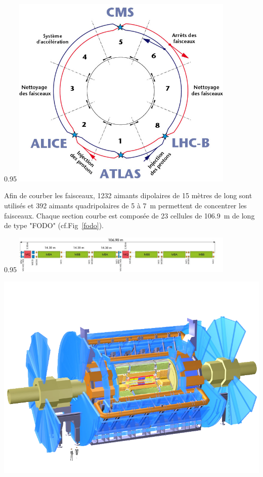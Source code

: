 \begin{minipagewithmarginpars}[ht!]{0.95\textwidth}
	\centering
	\includegraphics[width=0.80\textwidth]{LHC/lhc-schematic.jpg}
	\label{octants}	
\end{minipagewithmarginpars}

Afin de courber les faisceaux, \num{1232} aimants dipolaires de \num{15} mètres de long sont utilisés et \num{392} aimants quadripolaires de \num{5} à \SI{7}{\meter} permettent de concentrer les faisceaux. Chaque section courbe est composée de \num{23} cellules de \SI{106.9}{\meter} de long de type "FODO" (cf.Fig~\ref{fodo}).

\begin{minipagewithmarginpars}[ht!]{0.95\textwidth}
	\centering
	\includegraphics[width=0.8\textwidth]{LHC/arc.jpg}
	\label{fodo}	
\end{minipagewithmarginpars}

\marginpar
{
	\includegraphics[width=\marginparwidth]{LHC/atlas.png}
	\label{atlas}
}

